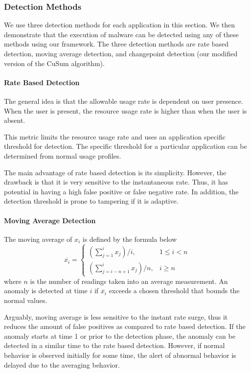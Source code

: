 \subsubsection{Detection Methods}

We use three detection methods for each application in this section.  We then
demonstrate that the execution of malware can be detected using any of these
methods using our framework.  The three detection methods are rate based
detection, moving average detection, and changepoint detection (our modified
version of the CuSum algorithm).

\paragraph{Rate Based Detection}

The general idea is that the allowable usage rate is dependent on user presence.
When the user is present, the resource usage rate is higher than 
when the user is absent.

This metric limits the resource usage rate 
and uses an application specific threshold for detection.
The specific threshold for a particular application 
can be determined from normal usage profiles.

The main advantage of rate based detection is its simplicity. 
However, the drawback is that it is very sensitive to the instantaneous rate. 
Thus, it has potential in having a high false positive or false negative rate. 
In addition, the detection threshold is prone to tampering if it is adaptive.

\paragraph{Moving Average Detection}

The moving average of $x_i$ is defined by the formula below
\begin{equation} %
    \overline{x_i} = \left\{ \begin{array}{lr}
        (\sum_{j=1}^{i}{x_j})/i, & 1 \leq i < n \\
        (\sum_{j=i-n+1}^{i}{x_j})/n, & i \geq n
    \end{array} \right.
\end{equation}
where $n$ is the number of readings taken into an average measurement. An
anomaly is detected at time $i$ if $\overline{x_i}$ exceeds a chosen threshold
that bounds the normal values.

Arguably, moving average is less sensitive to the instant rate surge, thus it
reduces the amount of false positives as compared to rate based detection. If
the anomaly starts at time 1 or prior to the detection phase, the anomaly can
be detected in a similar time to the rate based detection. However, if normal
behavior is observed initially for some time, the alert of abnormal behavior is
delayed due to the averaging behavior.

